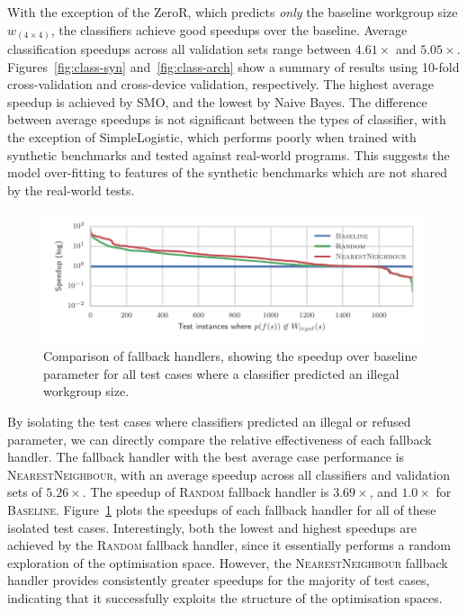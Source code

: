 \documentclass[nonatbib,preprint,10pt]{sigplanconf}
\begin{document}
With the exception of the ZeroR, which predicts \emph{only} the
baseline workgroup size $w_{\left( 4 \times 4 \right)}$, the
classifiers achieve good speedups over the baseline. Average
classification speedups across all validation sets range between
$4.61\times$ and $5.05\times$. Figures~\ref{fig:class-syn}
and~\ref{fig:class-arch} show a summary of results using 10-fold
cross-validation and cross-device validation, respectively.  The
highest average speedup is achieved by SMO, and the lowest by Naive
Bayes. The difference between average speedups is not significant
between the types of classifier, with the exception of SimpleLogistic,
which performs poorly when trained with synthetic benchmarks and
tested against real-world programs. This suggests the model
over-fitting to features of the synthetic benchmarks which are not
shared by the real-world
tests.

\begin{figure}
\centering
\includegraphics[width=\columnwidth]{img/fallback_speedups}
\caption[Comparison of fallback handler speedups]{%
  Comparison of fallback handlers, showing the speedup over baseline
  parameter for all test cases where a classifier predicted an illegal
  workgroup size.%
}
\label{fig:fallback-speedups}
\end{figure}

By isolating the test cases where classifiers predicted an illegal or
refused parameter, we can directly compare the relative effectiveness
of each fallback handler. The fallback handler with the best average
case performance is \textsc{NearestNeighbour}, with an average speedup
across all classifiers and validation sets of $5.26\times$. The
speedup of \textsc{Random} fallback handler is $3.69\times$, and
$1.0\times$ for \textsc{Baseline}. Figure~\ref{fig:fallback-speedups}
plots the speedups of each fallback handler for all of these isolated
test cases. Interestingly, both the lowest and highest speedups are
achieved by the \textsc{Random} fallback handler, since it essentially
performs a random exploration of the optimisation space. However, the
\textsc{NearestNeighbour} fallback handler provides consistently
greater speedups for the majority of test cases, indicating that it
successfully exploits the structure of the optimisation spaces.
\end{document}
